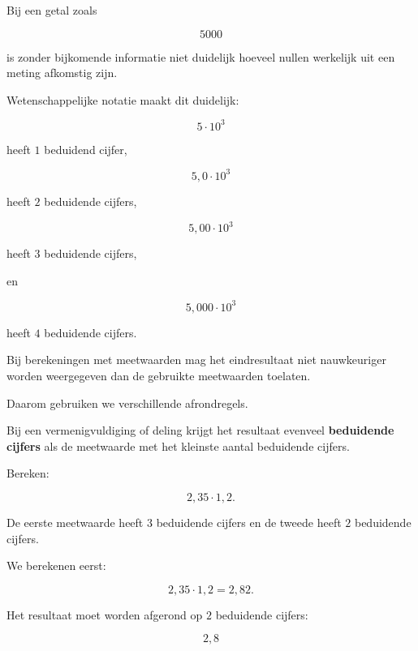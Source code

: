 \documentclass{ximera}
\begin{document}
\begin{voorbeeld}

Bij een getal zoals

\[
5000
\]

is zonder bijkomende informatie niet duidelijk hoeveel nullen werkelijk uit
een meting afkomstig zijn.

Wetenschappelijke notatie maakt dit duidelijk:

\[
5 \cdot 10^3
\]

heeft $1$ beduidend cijfer,

\[
5{,}0 \cdot 10^3
\]

heeft $2$ beduidende cijfers,

\[
5{,}00 \cdot 10^3
\]

heeft $3$ beduidende cijfers,

en

\[
5{,}000 \cdot 10^3
\]

heeft $4$ beduidende cijfers.

\end{voorbeeld}




Bij berekeningen met meetwaarden mag het eindresultaat niet nauwkeuriger
worden weergegeven dan de gebruikte meetwaarden toelaten.

Daarom gebruiken we verschillende afrondregels.



Bij een vermenigvuldiging of deling krijgt het resultaat evenveel
\textbf{beduidende cijfers} als de meetwaarde met het kleinste aantal
beduidende cijfers.

\begin{voorbeeld}

Bereken:

\[
2{,}35 \cdot 1{,}2.
\]

De eerste meetwaarde heeft $3$ beduidende cijfers en de tweede heeft
$2$ beduidende cijfers.

We berekenen eerst:

\[
2{,}35 \cdot 1{,}2 = 2{,}82.
\]

Het resultaat moet worden afgerond op $2$ beduidende cijfers:

\[
\boxed{2{,}8}
\]

\end{voorbeeld}
\end{document}
